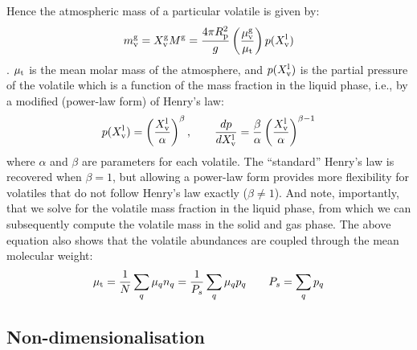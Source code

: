 Hence the  atmospheric mass of a particular volatile is given by:
\begin{equation}
m_{\rm v}^{\rm g} = X_{\rm v}^{\rm g} M^{\rm g} = \frac{4 \pi R_{\rm p}^2}{g} \left( \frac{\mu_{\rm v}^{\rm g}}{\mu_{\rm t}} \right) p (X_{\rm v}^{\rm l})
\end{equation}
.  $\mu_{\rm t}$ is the mean molar mass of the atmosphere, and $p(X_{\rm v}^{\rm l})$ is the partial pressure of the volatile which is a function of the mass fraction in the liquid phase, i.e., by a modified (power-law form) of Henry's law:
\begin{equation}
p( X_{\rm v}^{\rm l} ) = \left( \frac{X_{\rm v}^{\rm l}}{\alpha} \right)^\beta, \qquad \frac{dp}{d X_{\rm v}^{\rm l}} = \frac{\beta}{\alpha} \left( \frac{X_{\rm v}^{\rm l}}{\alpha} \right)^{\beta-1}
\end{equation}
where $\alpha$ and $\beta$ are parameters for each volatile.  The ``standard'' Henry's law is recovered when $\beta=1$, but allowing a power-law form provides more flexibility for volatiles that do not follow Henry's law exactly ($\beta \neq 1$).  
And note, importantly, that we solve for the volatile mass fraction in the liquid phase, from which we can subsequently compute the volatile mass in the solid and gas phase.  The above equation also shows that the volatile abundances are coupled through the mean molecular weight:
\begin{equation}
\mu_{\rm t} = \frac{1}{N} \sum_q \mu_q n_q = \frac{1}{P_s} \sum_q \mu_q p_q \qquad P_s = \sum_q p_q
\label{eq:atmosphere_molar_mass}
\end{equation}
\subsection{Non-dimensionalisation}
